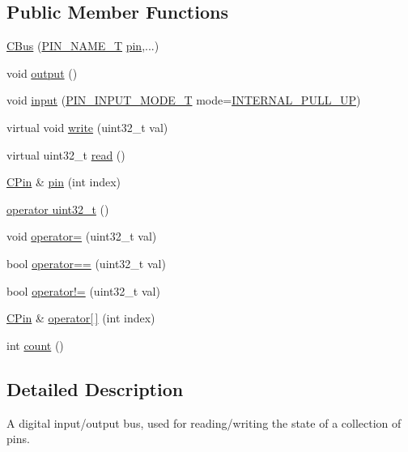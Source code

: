 \subsection*{Public Member Functions}
\begin{DoxyCompactItemize}
\item 
\hyperlink{class_c_bus_a5f859ac1582a6cbe9b5b420c6c051e63}{C\-Bus} (\hyperlink{group___enumerations_ga65a2241721e4acb573e0c3fe29ac432f}{P\-I\-N\-\_\-\-N\-A\-M\-E\-\_\-\-T} \hyperlink{class_c_bus_a94da38619defc1c41c16c04c4c7991f8}{pin},...)
\item 
void \hyperlink{class_c_bus_a5f797dca77eb5a86048c65e567a2d233}{output} ()
\item 
void \hyperlink{class_c_bus_ad45a06493f12aef3d096ac3ed86a3b8f}{input} (\hyperlink{group___enumerations_ga9f8f32709b482732d6e377ff26da36ef}{P\-I\-N\-\_\-\-I\-N\-P\-U\-T\-\_\-\-M\-O\-D\-E\-\_\-\-T} mode=\hyperlink{group___enumerations_gga9f8f32709b482732d6e377ff26da36efa781a7f23ae9b0dbdc6edfdcfd3be75df}{I\-N\-T\-E\-R\-N\-A\-L\-\_\-\-P\-U\-L\-L\-\_\-\-U\-P})
\item 
virtual void \hyperlink{class_c_bus_a4852669ff7ae53e68cf125aa49a87bd0}{write} (uint32\-\_\-t val)
\item 
virtual uint32\-\_\-t \hyperlink{class_c_bus_ae5c9d649c6f6b22a93fb29e0152a57c1}{read} ()
\item 
\hyperlink{class_c_pin}{C\-Pin} \& \hyperlink{class_c_bus_a94da38619defc1c41c16c04c4c7991f8}{pin} (int index)
\item 
\hyperlink{class_c_bus_add3835bd7327b63bdaa480938d5a8adc}{operator uint32\-\_\-t} ()
\item 
void \hyperlink{class_c_bus_a9f639b395906de4549c51deb0a0ad79c}{operator=} (uint32\-\_\-t val)
\item 
bool \hyperlink{class_c_bus_a55d1c493025b37e0f34801b8ced31068}{operator==} (uint32\-\_\-t val)
\item 
bool \hyperlink{class_c_bus_a3ea59ccbb16b92e2763a00b3baa10fd6}{operator!=} (uint32\-\_\-t val)
\item 
\hyperlink{class_c_pin}{C\-Pin} \& \hyperlink{class_c_bus_a12e4d076164971de589cbc5b2f6537e2}{operator\mbox{[}$\,$\mbox{]}} (int index)
\item 
int \hyperlink{class_c_bus_a4fa0e4c537c237278fe8092f4d8e26fb}{count} ()
\end{DoxyCompactItemize}


\subsection{Detailed Description}
A digital input/output bus, used for reading/writing the state of a collection of pins. 

